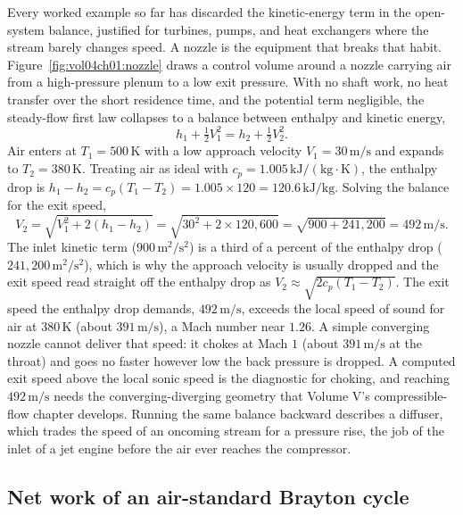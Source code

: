 Every worked example so far has discarded the kinetic-energy term in the
open-system balance, justified for turbines, pumps, and heat exchangers
where the stream barely changes speed. A nozzle is the equipment that
breaks that habit. Figure~\ref{fig:vol04ch01:nozzle} draws a control
volume around a nozzle carrying air from a high-pressure plenum to a low
exit pressure. With no shaft work, no heat transfer over the short
residence time, and the potential term negligible, the steady-flow first
law collapses to a balance between enthalpy and kinetic energy,
\[
h_1 + \tfrac12 V_1^2 = h_2 + \tfrac12 V_2^2.
\]
Air enters at $T_1 = 500\,\si{\kelvin}$ with a low approach velocity
$V_1 = 30\,\text{m}/\text{s}$ and expands to $T_2 = 380\,\si{\kelvin}$.
Treating air as ideal with $c_p = 1.005\,\text{kJ}/(\text{kg}\cdot
\si{\kelvin})$, the enthalpy drop is $h_1 - h_2 = c_p (T_1 - T_2) =
1.005 \times 120 = 120.6\,\text{kJ}/\text{kg}$. Solving the balance for
the exit speed,
\[
V_2 = \sqrt{V_1^2 + 2(h_1 - h_2)}
    = \sqrt{30^2 + 2 \times 120{,}600}
    = \sqrt{900 + 241{,}200}
    = 492\,\text{m}/\text{s}.
\]
The inlet kinetic term ($900\,\text{m}^2/\text{s}^2$) is a third of a
percent of the enthalpy drop ($241{,}200\,\text{m}^2/\text{s}^2$), which
is why the approach velocity is usually dropped and the exit speed read
straight off the enthalpy drop as $V_2 \approx \sqrt{2 c_p (T_1 - T_2)}$.
The exit speed the enthalpy drop demands, $492\,\text{m}/\text{s}$,
exceeds the local speed of sound for air at $380\,\si{\kelvin}$ (about
$391\,\text{m}/\text{s}$), a Mach number near $1.26$. A simple
converging nozzle cannot deliver that speed: it chokes at Mach $1$
(about $391\,\text{m}/\text{s}$ at the throat) and goes no faster
however low the back pressure is dropped. A computed exit speed above
the local sonic speed is the diagnostic for choking, and reaching
$492\,\text{m}/\text{s}$ needs the converging-diverging geometry that
Volume V's compressible-flow chapter develops. Running the same balance backward
describes a diffuser, which trades the speed of an oncoming stream for a
pressure rise, the job of the inlet of a jet engine before the air ever
reaches the compressor.



\subsection{Net work of an air-standard Brayton cycle}

